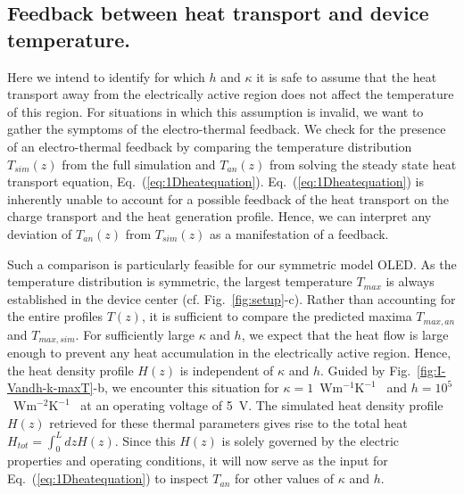 \documentclass[%
9pt,
 aip,
rsi,%
 amsmath,amssymb,
preprint,%
]{revtex4-1}
\newcommand{\thermalconductivity}{$\mathrm{W m^{-1} K^{-1}}$}
\newcommand{\hcoefficient}{$\mathrm{W m^{-2} K^{-1}}$}
\begin{document}
\subsection*{Feedback between heat transport and device temperature.}

Here we intend to identify for which $h$ and $\kappa$ it is safe to assume that the heat transport away from the electrically active region does not affect the temperature of this region. 
For situations in which this assumption is invalid, we want to gather the symptoms of the electro-thermal feedback.
We check for the presence of an electro-thermal feedback by comparing the temperature distribution $T_{sim}(z)$ from the full simulation and $T_{an}(z)$ from solving the steady state heat transport equation, Eq.~(\ref{eq:1Dheatequation}).
Eq.~(\ref{eq:1Dheatequation}) is inherently unable to account for a possible feedback of the heat transport on the charge transport and the heat generation profile.
Hence, we can interpret any deviation of $T_{an}(z)$ from $T_{sim}(z)$ as a manifestation of a feedback.

Such a comparison is particularly feasible for our symmetric model OLED.
As the temperature distribution is symmetric, the largest temperature $T_{max}$ is always established in the device center (cf. Fig.~\ref{fig:setup}-c). Rather than accounting for the entire profiles $T(z)$,
it is sufficient to compare the predicted maxima $T_{max,an}$ and $T_{max,sim}$.
For sufficiently large $\kappa$ and $h$, we expect that the heat flow is large enough to prevent any heat accumulation in the electrically active region. 
Hence, the heat density profile $H(z)$ is independent of $\kappa$ and $h$. %
Guided by Fig.~\ref{fig:I-Vandh-k-maxT}-b, we encounter this situation for $\kappa = 1$~\thermalconductivity~ and $h = 10^5$~\hcoefficient~ at an operating voltage of 5~V.  
The simulated heat density profile $H(z)$ retrieved for these thermal parameters gives rise to the total heat $H_{tot} = \int_0^L dz H(z)$. 
Since this $H(z)$ is solely governed by the electric properties and operating conditions, it will now serve as the input for Eq.~(\ref{eq:1Dheatequation}) to inspect $T_{an}$ for other values of $\kappa$ and $h$.
\end{document}
